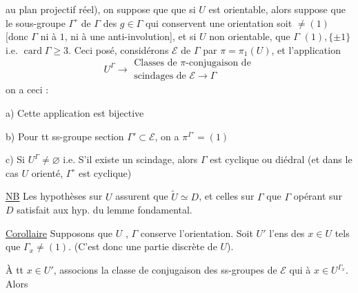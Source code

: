 au plan projectif réel), on suppose que  que  si $U$ est  orientable, alors   suppose que le sous-groupe $\Gamma^\circ$ de $\Gamma$ des $g\in\Gamma$ qui conservent une orientation soit $\ne(1)$ [donc $\Gamma$  ni à $1$, ni à une anti-involution], et si $U$ non orientable, que  $\Gamma$ \unsure{$\not\simeq$|$\ne$} $(1),\{\pm1\}$ i.e. $\operatorname{card}\Gamma\ge3$. Ceci posé,  considérons   $\mathcal E$ de $\Gamma$ par $\pi=\pi_1(U)$, et l'application
\[
U^\Gamma\longrightarrow\begin{gathered}
\text{Classes de }\pi\text{-conjugaison de}\\
\text{scindages de }\mathcal E\longrightarrow\Gamma
\end{gathered}
\]
on a ceci :

 a) Cette application est bijective

 b) Pour tt ss-groupe section $\Gamma'\subset\mathcal E$, on a $\pi^{\Gamma'}=(1)$

 c) Si $U^\Gamma\ne\varnothing$ i.e. S'il existe un scindage, alors $\Gamma$ est cyclique ou diédral (et dans le cas $U$ orienté, $\Gamma^\circ$ est cyclique)

\uline{NB} Les hypothèses sur $U$ assurent que $\widetilde U\simeq D$, et celles sur $\Gamma$ que $\Gamma$ opérant sur $D$ satisfait aux hyp. du lemme fondamental.




\uline{Corollaire} Supposons que $U$ ,  $\Gamma$ conserve l'orientation. Soit $U'$ l'ens des $x\in U$ tels que $\Gamma_x\ne(1)$. (C'est donc une partie discrète de $U$).

À tt $x\in U'$, associons la classe de conjugaison des ss-groupes de $\mathcal E$  qui  à  $x\in U^{\Gamma_x}$. Alors

